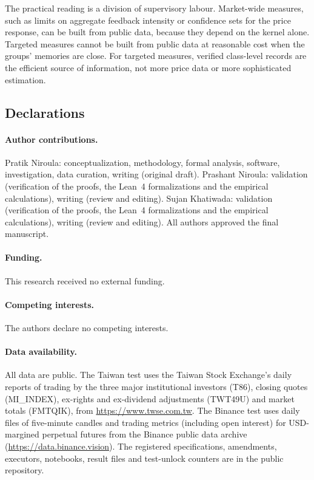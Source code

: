 \documentclass[12pt]{article}
\theoremstyle{definition}
\theoremstyle{remark}
\begin{document}
The practical reading is a division of supervisory labour. Market-wide measures, such as limits on aggregate feedback intensity or confidence sets for the price response, can be built from public data, because they depend on the kernel alone. Targeted measures cannot be built from public data at reasonable cost when the groups' memories are close. For targeted measures, verified class-level records are the efficient source of information, not more price data or more sophisticated estimation.

\subsection*{Declarations}

\paragraph{Author contributions.} Pratik Niroula: conceptualization, methodology, formal analysis, software, investigation, data curation, writing (original draft). Prashant Niroula: validation (verification of the proofs, the Lean~4 formalizations and the empirical calculations), writing (review and editing). Sujan Khatiwada: validation (verification of the proofs, the Lean~4 formalizations and the empirical calculations), writing (review and editing). All authors approved the final manuscript.

\paragraph{Funding.} This research received no external funding.

\paragraph{Competing interests.} The authors declare no competing interests.

\paragraph{Data availability.} All data are public. The Taiwan test uses the Taiwan Stock Exchange's daily reports of trading by the three major institutional investors (T86), closing quotes (MI\_INDEX), ex-rights and ex-dividend adjustments (TWT49U) and market totals (FMTQIK), from \url{https://www.twse.com.tw}. The Binance test uses daily files of five-minute candles and trading metrics (including open interest) for USD-margined perpetual futures from the Binance public data archive (\url{https://data.binance.vision}). The registered specifications, amendments, executors, notebooks, result files and test-unlock counters are in the public repository.
\end{document}
